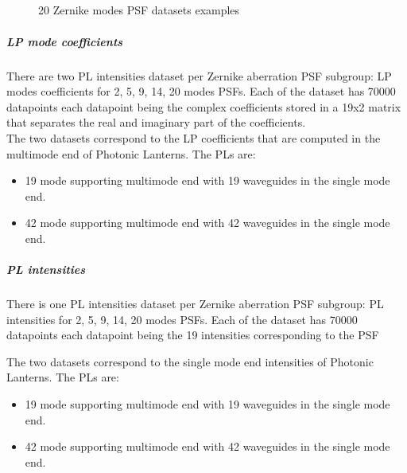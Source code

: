 			\begin{figure*}[ht!]
				\centering	
				\\
					
				\\
					
				\\
					
				\\
			
			\caption{20 Zernike modes PSF datasets examples}
		\end{figure*}
		\FloatBarrier
		\subparagraph{LP mode coefficients}
			There are two PL intensities dataset per Zernike aberration PSF subgroup: LP modes coefficients for 2, 5, 9, 14, 20 modes PSFs. Each of the dataset has 70000 datapoints each datapoint being the complex coefficients stored in a 19x2 matrix that separates the real and imaginary part of the coefficients.\\
			
			The two datasets correspond to the LP coefficients that are computed in the multimode end of Photonic Lanterns. The PLs are:
			\begin{itemize}
				\item 19 mode supporting multimode end with 19 waveguides in the single mode end.
				\item 42 mode supporting multimode end with 42 waveguides in the single mode end.
			\end{itemize}
			
		\subparagraph{PL intensities}
		
			There is one PL intensities dataset per Zernike aberration PSF subgroup: PL intensities for 2, 5, 9, 14, 20 modes PSFs. Each of the dataset has 70000 datapoints each datapoint being the 19 intensities corresponding to the PSF
			
			The two datasets correspond to the single mode end intensities of Photonic Lanterns. The PLs are:
			\begin{itemize}
				\item 19 mode supporting multimode end with 19 waveguides in the single mode end.
				\item 42 mode supporting multimode end with 42 waveguides in the single mode end.
			\end{itemize}

\finishday